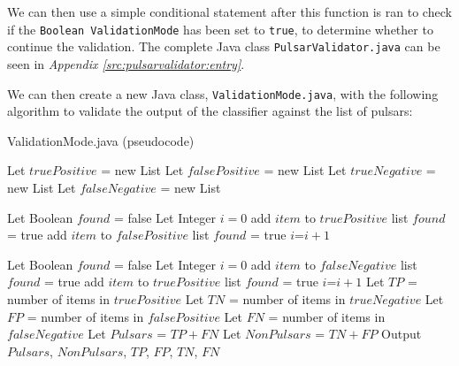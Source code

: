 \documentclass{article}
\begin{document}
\begin{appendices}
\begin{subappendices}
        We can then use a simple conditional statement after this function is ran to check if the \verb|Boolean ValidationMode| has been set to \verb|true|, to determine whether to continue the validation. The complete Java class \verb|PulsarValidator.java| can be seen in \emph{Appendix \ref{src:pulsarvalidator:entry}}.
        
        We can then create a new Java class, \verb|ValidationMode.java|, with the following algorithm to validate the output of the classifier against the list of pulsars:
        
        \begin{algorithm}[H]
            \caption{ValidationMode.java (pseudocode)}
            \begin{algorithmic}
                \State Let $truePositive$ = new List
                \State Let $falsePositive$ = new List
                \State Let $trueNegative$ = new List
                \State Let $falseNegative$ = new List
                
                    \State Let Boolean $found$ = false
                    \State Let Integer $i=0$
                            \State add $item$ to $truePositive$ list
                            \State $found$ = true
                            \State add $item$ to $falsePositive$ list
                            \State $found$ = true
                        \Else
                            \State $i$=$i+1$
                        \EndIf
                    \EndWhile
                \EndFor
        
                    \State Let Boolean $found$ = false
                    \State Let Integer $i=0$
                            \State add $item$ to $falseNegative$ list
                            \State $found$ = true
                            \State add $item$ to $truePositive$ list
                            \State $found$ = true
                        \Else
                            \State $i$=$i+1$
                        \EndIf
                    \EndWhile
                \EndFor
                \State Let $TP$ = number of items in $truePositive$
                \State Let $TN$ = number of items in $trueNegative$
                \State Let $FP$ = number of items in $falsePositive$
                \State Let $FN$ = number of items in $falseNegative$
                \State Let $Pulsars$ = $TP+FN$
                \State Let $NonPulsars$ = $TN+FP$
                \State Output $Pulsars$, $NonPulsars$, $TP$, $FP$, $TN$, $FN$
            \end{algorithmic}
        \end{algorithm}
        

\end{subappendices}
\end{appendices}
\end{document}
